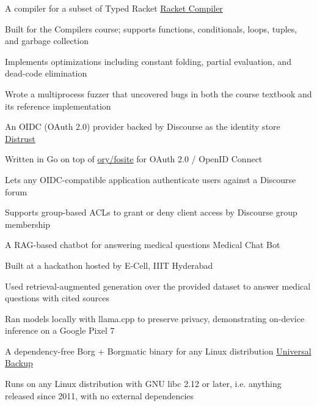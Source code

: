 \begin{cventries}
  \cventry
    {A compiler for a subset of Typed Racket} %
    {\href{https://github.com/necessary129/diesun}{Racket Compiler}} %
    {} %
    {} %
    {
      \begin{cvitems} %
        \item {Built for the Compilers course; supports functions, conditionals, loops, tuples, and garbage collection}
        \item {Implements optimizations including constant folding, partial evaluation, and dead-code elimination}
        \item {Wrote a multiprocess fuzzer that uncovered bugs in both the course textbook and its reference implementation}
      \end{cvitems}
    }

  \cventry
    {An OIDC (OAuth 2.0) provider backed by Discourse as the identity store} %
    {\href{https://github.com/necessary129/distrust}{Distrust}} %
    {} %
    {} %
    {
      \begin{cvitems} %
        \item {Written in Go on top of \href{https://github.com/ory/fosite}{ory/fosite} for OAuth 2.0 / OpenID Connect}
        \item {Lets any OIDC-compatible application authenticate users against a Discourse forum}
        \item {Supports group-based ACLs to grant or deny client access by Discourse group membership}
      \end{cvitems}
    }

  \cventry
    {A RAG-based chatbot for answering medical questions} %
    {Medical Chat Bot} %
    {} %
    {} %
    {
      \begin{cvitems} %
        \item {Built at a hackathon hosted by E-Cell, IIIT Hyderabad}
        \item {Used retrieval-augmented generation over the provided dataset to answer medical questions with cited sources}
        \item {Ran models locally with llama.cpp to preserve privacy, demonstrating on-device inference on a Google Pixel 7}
      \end{cvitems}
    }

  \cventry
    {A dependency-free Borg + Borgmatic binary for any Linux distribution} %
    {\href{https://github.com/necessary129/the-universal-borgmatic}{Universal Backup}} %
    {} %
    {} %
    {
      \begin{cvitems} %
        \item {Runs on any Linux distribution with GNU libc 2.12 or later, i.e. anything released since 2011, with no external dependencies}
      \end{cvitems}
    }


\end{cventries}
